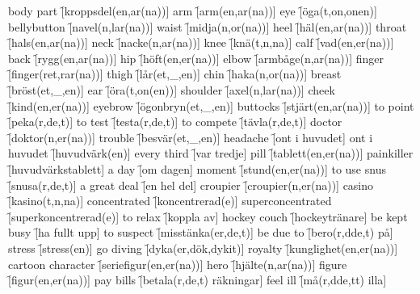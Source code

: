\begin{questions}
    \begin{multicols}{2}
        \raggedcolumns
        \question body part \f[kroppsdel(en,ar(na))]
        \question arm \f[arm(en,ar(na))]
        \question eye \f[öga(t,on,onen)]
        \question bellybutton \f[navel(n,lar(na))]
        \question waist \f[midja(n,or(na))]
        \question heel \f[häl(en,ar(na))]
        \question throat \f[hals(en,ar(na))]
        \question neck \f[nacke(n,ar(na))]
        \question knee \f[knä(t,n,na)]
        \question calf \f[vad(en,er(na))]
        \question back \f[rygg(en,ar(na))]
        \question hip \f[höft(en,er(na))]
        \question elbow \f[armbåge(n,ar(na))]
        \question finger \f[finger(ret,rar(na))]
        \question thigh \f[lår(et,\_,en)]
        \question chin \f[haka(n,or(na))]
        \question breast \f[bröst(et,\_,en)]
        \question ear \f[öra(t,on(en))]
        \question shoulder \f[axel(n,lar(na))]
        \question cheek \f[kind(en,er(na))]
        \question eyebrow \f[ögonbryn(et,\_,en)]
        \question buttocks \f[stjärt(en,ar(na))]
        \question to point \f[peka(r,de,t)]
        \question to test \f[testa(r,de,t)]
        \question to compete \f[tävla(r,de,t)]
        \question doctor \f[doktor(n,er(na))]
        \question trouble \f[besvär(et,\_,en)]
        \question headache \f[ont i huvudet]
        \question ont i huvudet \f[huvudvärk(en)]
        \question every third \f[var tredje]
        \question pill \f[tablett(en,er(na))]
        \question painkiller \f[huvudvärkstablett]
        \question a day \f[om dagen]
        \question moment \f[stund(en,er(na))]
        \question to use snus \f[snusa(r,de,t)]
        \question a great deal \f[en hel del]
        \question croupier \f[croupier(n,er(na))]
        \question casino \f[kasino(t,n,na)]
        \question concentrated \f[koncentrerad(e)]
        \question superconcentrated \f[superkoncentrerad(e)]
        \question to relax \f[koppla av]
        \question hockey couch \f[hockeytränare]
        \question be kept busy \f[ha fullt upp]
        \question to suspect \f[misstänka(er,de,t)]
        \question be due to \f[bero(r,dde,t) på]
        \question stress \f[stress(en)]
        \question go diving \f[dyka(er,dök,dykit)]
        \question royalty \f[kunglighet(en,er(na))]
        \question cartoon character \f[seriefigur(en,er(na))]
        \question hero \f[hjälte(n,ar(na))]
        \question figure \f[figur(en,er(na))]
        \question pay bills \f[betala(r,de,t) räkningar]
        \question feel ill \f[må(r,dde,tt) illa]

\end{multicols}
\end{questions}
